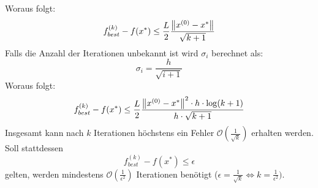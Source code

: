 Woraus folgt:
\begin{equation}
 f_{best}^{(k)}-f(x^*) \leq \frac{L}{2}\frac{\left\lVert x^{(0)}-x^*\right\rVert}{\sqrt{k+1}}
\end{equation}
Falls die Anzahl der Iterationen unbekannt ist wird $\sigma_i$ berechnet als:
\begin{equation}
 \sigma_i = \frac{h}{\sqrt{i+1}}
\end{equation}
Woraus folgt:
\begin{equation}
 f_{best}^{(k)} - f(x^*) \leq \frac{L}{2}\frac{\left\lVert x^{(0)}-x^*\right\rVert^2\cdot h\cdot \log(k+1)}{h\cdot\sqrt{k+1}}
\end{equation}
Insgesamt kann nach $k$ Iterationen höchstens ein Fehler $\mathcal{O}\left(\frac{1}{\sqrt{k}}\right)$
erhalten werden. Soll stattdessen
\begin{equation}
 f_{best}^{(k)}-f(x^*) \leq \epsilon
\end{equation}
gelten, werden mindestens $\mathcal{O}\left(\frac{1}{\epsilon^2}\right)$ Iterationen benötigt ($\epsilon = 
\frac{1}{\sqrt{k}} \Leftrightarrow k = \frac{1}{\epsilon^2})$.









































